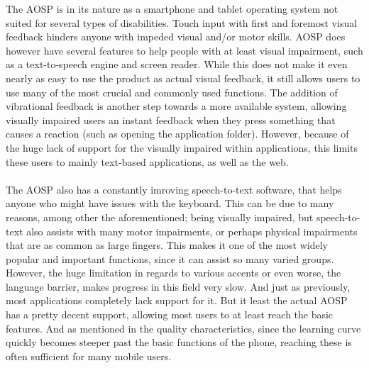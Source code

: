 \documentclass[conference]{IEEEtran}
\begin{document}
The AOSP is in its nature as a smartphone and tablet operating system not suited for several types of disabilities. Touch input with first and foremost visual feedback hinders anyone with impeded visual and/or motor skills. AOSP does however have several features to help people with at least visual impairment, such as a text-to-speech engine and screen reader.\cite{Android-disabled-help} While this does not make it even nearly as easy to use the product as actual visual feedback, it still allows users to use many of the most crucial and commonly used functions. The addition of vibrational feedback is another step towards a more available system, allowing visually impaired users an instant feedback when they press something that causes a reaction (such as opening the application folder). However, because of the huge lack of support for the visually impaired within applications, this limits these users to mainly text-based applications, as well as the web. 
\\\\The AOSP also has a constantly imroving speech-to-text software, that helps anyone who might have issues with the keyboard. This can be due to many reasons, among other the aforementioned; being visually impaired, but speech-to-text also assists with many motor impairments, or perhaps physical impairments that are as common as large fingers. This makes it one of the most widely popular and important functions, since it can assist so many varied groups. However, the huge limitation in regards to various accents or even worse, the language barrier, makes progress in this field very slow. And just as previously, most applications completely lack support for it. But it least the actual AOSP has a pretty decent support, allowing most users to at least reach the basic features. And as mentioned in the quality characteristics, since the learning curve quickly becomes steeper past the basic functions of the phone, reaching these is often sufficient for many mobile users. 
\end{document}
